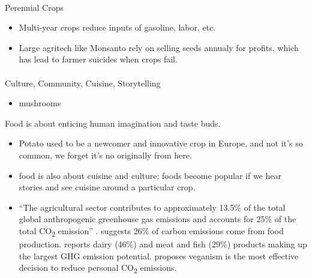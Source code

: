\documentclass[
  letterpaper,
  DIV=11,
  numbers=noendperiod]{scrartcl}
\makeatletter
\let\oldparagraph\paragraph
\renewcommand{\paragraph}{
    \@ifstar
      \xxxParagraphStar
      \xxxParagraphNoStar
  }
\newcommand{\xxxParagraphStar}[1]{\oldparagraph*{#1}\mbox{}}
\newcommand{\xxxParagraphNoStar}[1]{\oldparagraph{#1}\mbox{}}
\providecommand{\tightlist}{%
  \setlength{\itemsep}{0pt}\setlength{\parskip}{0pt}}\usepackage{longtable,booktabs,array}
\makeatother
\begin{document}
\paragraph{Perennial Crops}\label{perennial-crops}

\begin{itemize}
\item
  Multi-year crops reduce inputs of gasoline, labor, etc.
  \citet{aubreystreitkrugPathwaysPerennialFood2023}
\item
  Large agritech like Monsanto rely on selling seeds annualy for
  profits, which has lead to farmer suicides when crops fail.
\end{itemize}

\paragraph{Culture, Community, Cuisine,
Storytelling}\label{culture-community-cuisine-storytelling}

\begin{itemize}
\tightlist
\item
  \citet{tsingMushroomEndWorld2015} mushrooms
\end{itemize}

Food is about enticing human imagination and taste buds.

\begin{itemize}
\item
  Potato used to be a newcomer and innovative crop in Europe, and not
  it's so common, we forget it's no originally from here.
\item
  \citet{aubreystreitkrugPathwaysPerennialFood2023} food is also about
  cuisine and culture; foods become popular if we hear stories and see
  cuisine around a particular crop.
\item
  ``The agricultural sector contributes to approximately 13.5\% of the
  total global anthropogenic greenhouse gas emissions and accounts for
  25\% of the total CO\textsubscript{2} emission''
  \citet{nabipourafrouziComprehensiveReviewCarbon2023}.
  \citet{pooreReducingFoodEnvironmental2018} suggests 26\% of carbon
  emissions come from food production. \citet{FoodPrints2015} reports
  dairy (46\%) and meat and fish (29\%) products making up the largest
  GHG emission potential. \citet{springmannGlobalRegionalCosts2021}
  proposes veganism is the most effective decision to reduce personal
  CO\textsubscript{2} emissions.
\end{itemize}
\end{document}
